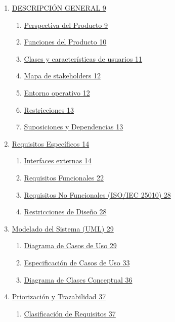 \documentclass[
]{article}
\begin{document}
\begin{enumerate}
\def\labelenumi{\arabic{enumi}.}
\setcounter{enumi}{1}
\item
  \hyperref[descripciuxf3n-general-1]{DESCRIPCIÓN GENERAL 9}

  \begin{enumerate}
  \def\labelenumii{\arabic{enumii}.}
  \item
    \hyperref[perspectiva-del-producto]{Perspectiva del Producto 9}
  \item
    \hyperref[funciones-del-producto]{Funciones del Producto 10}
  \item
    \hyperref[clases-y-caracteruxedsticas-de-usuarios]{Clases y
    características de usuarios 11}
  \item
    \hyperref[mapa-de-stakeholders]{Mapa de stakeholders 12}
  \item
    \hyperref[_bookmark19]{Entorno operativo 12}
  \item
    \hyperref[restricciones]{Restricciones 13}
  \item
    \hyperref[suposiciones-y-dependencias]{Suposiciones y Dependencias
    13}
  \end{enumerate}
\item
  \hyperref[requisitos-especuxedficos]{Requisitos Específicos 14}

  \begin{enumerate}
  \def\labelenumii{\arabic{enumii}.}
  \item
    \hyperref[interfaces-externas]{Interfaces externas 14}
  \item
    \hyperref[requisitos-funcionales]{Requisitos Funcionales 22}
  \item
    \hyperref[requisitos-no-funcionales-isoiec-25010]{Requisitos No
    Funcionales (ISO/IEC 25010) 28}
  \item
    \hyperref[restricciones-de-diseuxf1o]{Restricciones de Diseño 28}
  \end{enumerate}
\item
  \hyperref[modelado-del-sistema-uml]{Modelado del Sistema (UML) 29}

  \begin{enumerate}
  \def\labelenumii{\arabic{enumii}.}
  \item
    \hyperref[diagrama-de-casos-de-uso]{Diagrama de Casos de Uso 29}
  \item
    \hyperref[especificaciuxf3n-de-casos-de-uso]{Especificación de Casos
    de Uso 33}
  \item
    \hyperref[diagrama-de-clases-conceptual]{Diagrama de Clases
    Conceptual 36}
  \end{enumerate}
\item
  \hyperref[priorizaciuxf3n-y-trazabilidad]{Priorización y Trazabilidad
  37}

  \begin{enumerate}
  \def\labelenumii{\arabic{enumii}.}
  \item
    \hyperref[_bookmark59]{Clasificación de Requisitos 37}
  \end{enumerate}
\end{enumerate}
\end{document}
